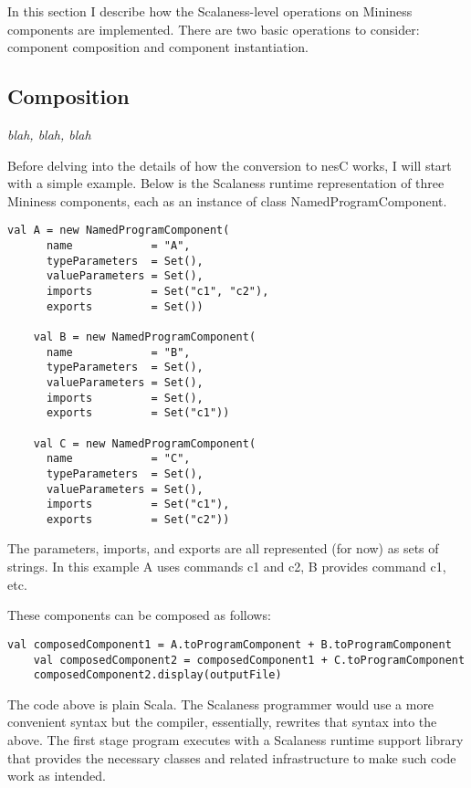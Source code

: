 In this section I describe how the Scalaness-level operations on Mininess components are
implemented. There are two basic operations to consider: component composition and component
instantiation.

\subsection{Composition}

\textit{blah, blah, blah}

Before delving into the details of how the conversion to nesC works, I will start with a simple
example. Below is the Scalaness runtime representation of three Mininess components, each as an
instance of class NamedProgramComponent.

\singlespace
\begin{lstlisting}[language=scalaness]
    val A = new NamedProgramComponent(
      name            = "A",
      typeParameters  = Set(),
      valueParameters = Set(),
      imports         = Set("c1", "c2"),
      exports         = Set())

    val B = new NamedProgramComponent(
      name            = "B",
      typeParameters  = Set(),
      valueParameters = Set(),
      imports         = Set(),
      exports         = Set("c1"))

    val C = new NamedProgramComponent(
      name            = "C",
      typeParameters  = Set(),
      valueParameters = Set(),
      imports         = Set("c1"),
      exports         = Set("c2"))
\end{lstlisting}
\primaryspacing

The parameters, imports, and exports are all represented (for now) as sets of strings. In this
example A uses commands c1 and c2, B provides command c1, etc.

These components can be composed as follows:

\singlespace
\begin{lstlisting}[language=scalaness]
    val composedComponent1 = A.toProgramComponent + B.toProgramComponent
    val composedComponent2 = composedComponent1 + C.toProgramComponent
    composedComponent2.display(outputFile)
\end{lstlisting}
\primaryspacing

The code above is plain Scala. The Scalaness programmer would use a more convenient syntax but
the compiler, essentially, rewrites that syntax into the above. The first stage program executes
with a Scalaness runtime support library that provides the necessary classes and related
infrastructure to make such code work as intended.

